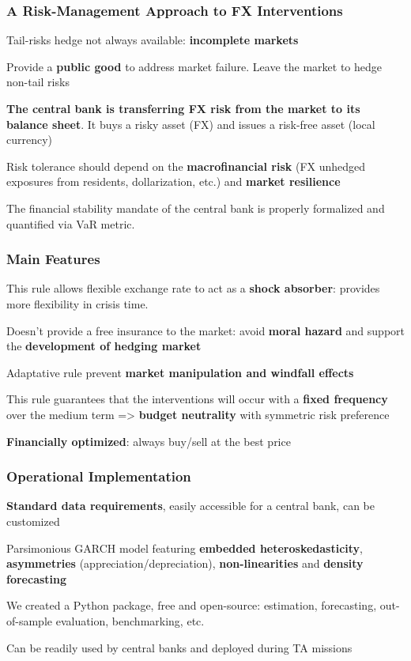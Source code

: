 \documentclass{beamer}
\newenvironment{largeitemize}{\itemize\addtolength{\itemsep}{10pt}}{\enditemize}
\newenvironment{largeenumerate}{\enumerate\addtolength{\itemsep}{10pt}}{\endenumerate}
\begin{document}
\begin{frame}
  \frametitle{A Risk-Management Approach to FX Interventions}
  \begin{largeitemize}
    \item Tail-risks hedge not always available: \textbf{incomplete markets}
    \item Provide a \textbf{public good} to address market failure. Leave the market
      to hedge non-tail risks
    \item \textbf{The central bank is transferring FX risk from the market to
      its balance sheet}. It buys a risky asset (FX) and issues a risk-free asset
      (local currency)
    \item Risk tolerance should depend on the \textbf{macrofinancial risk} (FX
      unhedged exposures from residents, dollarization, etc.) and \textbf{market resilience}
    \item The financial stability mandate of the central bank is properly
      formalized and quantified via VaR metric.
  \end{largeitemize}  
\end{frame}

\begin{frame}
    \frametitle{Main Features}
  \begin{largeenumerate}
  \item This rule allows flexible exchange rate to act as a \textbf{shock absorber}:
    provides more flexibility in crisis time.
  \item Doesn't provide a free insurance to the market: avoid \textbf{moral
      hazard} and support the \textbf{development of hedging market}
  \item Adaptative rule prevent \textbf{market manipulation and windfall effects}
  \item This rule guarantees that the interventions will occur with a \textbf{fixed
        frequency} over the medium term => \textbf{budget neutrality} with
      symmetric risk preference
  \item \textbf{Financially optimized}: always buy/sell at the best price
  \end{largeenumerate}  
\end{frame}


\begin{frame}
  \frametitle{Operational Implementation}
  \begin{largeitemize}
  \item \textbf{Standard data requirements}, easily accessible for a central
    bank, can be customized
  \item Parsimonious GARCH model featuring \textbf{embedded heteroskedasticity},  \textbf{asymmetries}
    (appreciation/depreciation), \textbf{non-linearities} and \textbf{density forecasting}    
  \item We created a Python package, free and open-source: estimation, forecasting,
    out-of-sample evaluation, benchmarking, etc. 
  \item Can be readily used by central banks and deployed during TA missions
  \end{largeitemize}
\end{frame}
\end{document}
